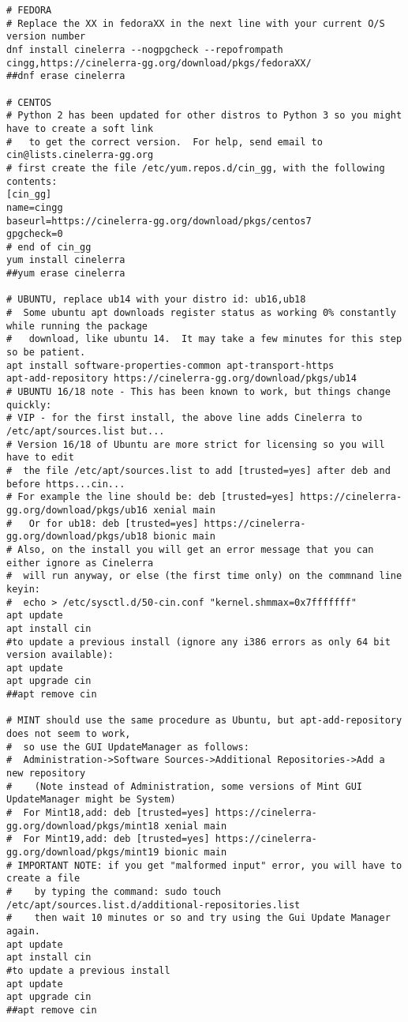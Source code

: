\begin{lstlisting}[numbers=none]
# FEDORA
# Replace the XX in fedoraXX in the next line with your current O/S version number
dnf install cinelerra --nogpgcheck --repofrompath cingg,https://cinelerra-gg.org/download/pkgs/fedoraXX/
##dnf erase cinelerra

# CENTOS
# Python 2 has been updated for other distros to Python 3 so you might have to create a soft link
#   to get the correct version.  For help, send email to cin@lists.cinelerra-gg.org
# first create the file /etc/yum.repos.d/cin_gg, with the following contents:
[cin_gg]
name=cingg
baseurl=https://cinelerra-gg.org/download/pkgs/centos7
gpgcheck=0
# end of cin_gg
yum install cinelerra
##yum erase cinelerra

# UBUNTU, replace ub14 with your distro id: ub16,ub18
#  Some ubuntu apt downloads register status as working 0% constantly while running the package
#   download, like ubuntu 14.  It may take a few minutes for this step so be patient.
apt install software-properties-common apt-transport-https
apt-add-repository https://cinelerra-gg.org/download/pkgs/ub14
# UBUNTU 16/18 note - This has been known to work, but things change quickly:
# VIP - for the first install, the above line adds Cinelerra to /etc/apt/sources.list but...
# Version 16/18 of Ubuntu are more strict for licensing so you will have to edit
#  the file /etc/apt/sources.list to add [trusted=yes] after deb and before https...cin...
# For example the line should be: deb [trusted=yes] https://cinelerra-gg.org/download/pkgs/ub16 xenial main
#   Or for ub18: deb [trusted=yes] https://cinelerra-gg.org/download/pkgs/ub18 bionic main
# Also, on the install you will get an error message that you can either ignore as Cinelerra
#  will run anyway, or else (the first time only) on the commnand line keyin: 
#  echo > /etc/sysctl.d/50-cin.conf "kernel.shmmax=0x7fffffff"
apt update
apt install cin
#to update a previous install (ignore any i386 errors as only 64 bit version available):
apt update
apt upgrade cin
##apt remove cin

# MINT should use the same procedure as Ubuntu, but apt-add-repository does not seem to work,
#  so use the GUI UpdateManager as follows:
#  Administration->Software Sources->Additional Repositories->Add a new repository
#    (Note instead of Administration, some versions of Mint GUI UpdateManager might be System)
#  For Mint18,add: deb [trusted=yes] https://cinelerra-gg.org/download/pkgs/mint18 xenial main
#  For Mint19,add: deb [trusted=yes] https://cinelerra-gg.org/download/pkgs/mint19 bionic main
# IMPORTANT NOTE: if you get "malformed input" error, you will have to create a file
#    by typing the command: sudo touch /etc/apt/sources.list.d/additional-repositories.list
#    then wait 10 minutes or so and try using the Gui Update Manager again.
apt update
apt install cin
#to update a previous install
apt update
apt upgrade cin
##apt remove cin


\end{lstlisting}
